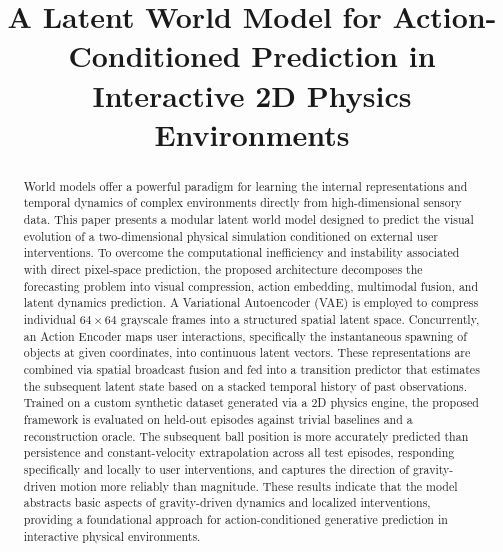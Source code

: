 \documentclass[conference]{IEEEtran}
\begin{document}
\title{A Latent World Model for Action-Conditioned Prediction in Interactive 2D Physics Environments}

\author{
\and
{}
\and
{}
\and
{}
}

\maketitle

\begin{abstract}
World models offer a powerful paradigm for learning the internal representations and temporal dynamics of complex environments directly from high-dimensional sensory data. This paper presents a modular latent world model designed to predict the visual evolution of a two-dimensional physical simulation conditioned on external user interventions. To overcome the computational inefficiency and instability associated with direct pixel-space prediction, the proposed architecture decomposes the forecasting problem into visual compression, action embedding, multimodal fusion, and latent dynamics prediction. A Variational Autoencoder (VAE) is employed to compress individual $64 \times 64$ grayscale frames into a structured spatial latent space. Concurrently, an Action Encoder maps user interactions, specifically the instantaneous spawning of objects at given coordinates, into continuous latent vectors. These representations are combined via spatial broadcast fusion and fed into a transition predictor that estimates the subsequent latent state based on a stacked temporal history of past observations. Trained on a custom synthetic dataset generated via a 2D physics engine, the proposed framework is evaluated on held-out episodes against trivial baselines and a reconstruction oracle. The subsequent ball position is more accurately predicted than persistence and constant-velocity extrapolation across all test episodes, responding specifically and locally to user interventions, and captures the direction of gravity-driven motion more reliably than magnitude. These results indicate that the model abstracts basic aspects of gravity-driven dynamics and localized interventions, providing a foundational approach for action-conditioned generative prediction in interactive physical environments.
\end{abstract}
\end{document}

